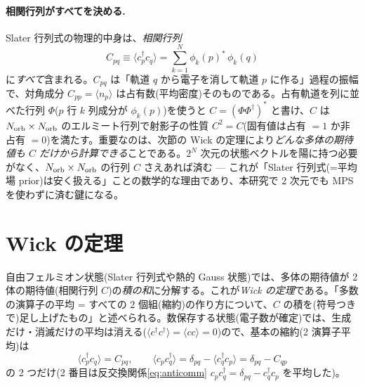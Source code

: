 \documentclass[11pt,a4paper]{ltjsarticle}
\newcommand{\ev}[1]{\langle #1\rangle}
\newcommand{\cd}{c^\dagger}
\begin{document}
\paragraph{相関行列がすべてを決める.}Slater 行列式の物理的中身は、\emph{相関行列}
\begin{equation}
  C_{pq} \equiv \ev{\cd_p c_q} = \sum_{k=1}^{N}\phi_k(p)^*\,\phi_k(q)
  \label{eq:corrmat}
\end{equation}
に\emph{すべて}含まれる。$C_{pq}$ は「軌道 $q$ から電子を消して軌道 $p$ に作る」過程の振幅で、対角成分 $C_{pp}=\ev{n_p}$ は占有数(平均密度)そのものである。占有軌道を列に並べた行列 $\Phi$($p$ 行 $k$ 列成分が $\phi_k(p)$)を使うと $C=(\Phi\Phi^\dagger)^{\!*}$ と書け、$C$ は $N_{\rm orb}\times N_{\rm orb}$ のエルミート行列で射影子の性質 $C^2=C$(固有値は占有 $=1$ か非占有 $=0$)を満たす。重要なのは、次節の Wick の定理により\emph{どんな多体の期待値も $C$ だけから計算できる}ことである。$2^{N}$ 次元の状態ベクトルを陽に持つ必要がなく、$N_{\rm orb}\times N_{\rm orb}$ の行列 $C$ さえあれば済む — これが「Slater 行列式(=平均場 prior)は安く扱える」ことの数学的な理由であり、本研究で 2 次元でも MPS を使わずに済む鍵になる。

\section{Wick の定理}
\label{sec:wick-tutorial}

自由フェルミオン状態(Slater 行列式や熱的 Gauss 状態)では、多体の期待値が 2 体の期待値(相関行列 $C$)の\emph{積の和}に分解する。これが\emph{Wick の定理}である。「多数の演算子の平均 = すべての 2 個組(縮約)の作り方について、$C$ の積を(符号つきで)足し上げたもの」と述べられる。数保存する状態(電子数が確定)では、生成だけ・消滅だけの平均は消える($\ev{\cd\cd}=\ev{cc}=0$)ので、基本の縮約(2 演算子平均)は
\begin{equation}
  \ev{\cd_p c_q}=C_{pq},\qquad
  \ev{c_p \cd_q}=\delta_{pq}-\ev{\cd_q c_p}=\delta_{pq}-C_{qp}
\end{equation}
の 2 つだけ(2 番目は反交換関係\eqref{eq:anticomm} $c_p\cd_q=\delta_{pq}-\cd_q c_p$ を平均した)。
\end{document}
